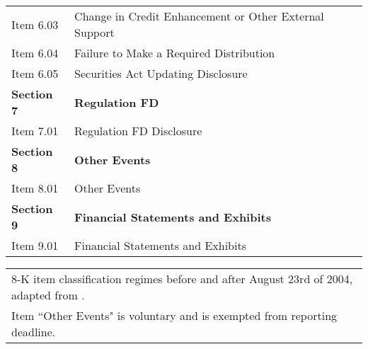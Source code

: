 \begin{table}[H]
\begin{tabular}{ll}
    Item 6.03 & Change in Credit Enhancement or Other External Support \\
    Item 6.04 & Failure to Make a Required Distribution \\
    Item 6.05 & Securities Act Updating Disclosure \\
    \textbf{Section 7} & \textbf{Regulation FD} \\
    Item 7.01 & Regulation FD Disclosure \\
    \textbf{Section 8} & \textbf{Other Events} \\
    Item 8.01 & Other Events \\
    \textbf{Section 9} & \textbf{Financial Statements and Exhibits} \\
    Item 9.01 & Financial Statements and Exhibits \\
    \end{tabular}%

\begin{tabular}{l}
8-K item classification regimes before and after August 23rd of 2004, adapted from \cite{secFinalRuleAdditional2004}. \\
Item ``Other Events" is voluntary and is exempted from reporting deadline.
\end{tabular}
\end{table}%
